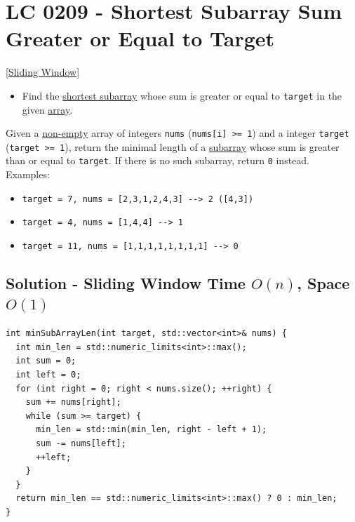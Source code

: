 \section{LC 0209 - Shortest Subarray Sum Greater or Equal to Target}\label{lc0209}
{\hyperref[sec:sliding_window]{[Sliding Window]}}

\begin{tcolorbox}
\begin{itemize}
\item Find the \ul{shortest subarray} whose sum is greater or equal to {\colorbox{CodeBackground}{\lstinline|target|}} in the given \ul{array}.
\end{itemize}
\end{tcolorbox}

Given a \ul{non-empty} array of integers {\colorbox{CodeBackground}{\lstinline|nums|}} ({\colorbox{CodeBackground}{\lstinline|nums[i] >= 1|}}) and a integer {\colorbox{CodeBackground}{\lstinline|target|}} ({\colorbox{CodeBackground}{\lstinline|target >= 1|}}), return the minimal length of a \ul{subarray} whose sum is greater than or equal to {\colorbox{CodeBackground}{\lstinline|target|}}. If there is no such subarray, return {\colorbox{CodeBackground}{\lstinline|0|}} instead.\\

Examples:
\begin{itemize}
\item {\colorbox{CodeBackground}{\lstinline|target = 7, nums = [2,3,1,2,4,3] --> 2 ([4,3])|}}
\item {\colorbox{CodeBackground}{\lstinline|target = 4, nums = [1,4,4] --> 1|}}
\item {\colorbox{CodeBackground}{\lstinline|target = 11, nums = [1,1,1,1,1,1,1,1] --> 0|}}
\end{itemize}

\subsection*{Solution - Sliding Window {\scriptsize\color{gray}\Coffeecup\hspace{1mm}Time $O(n)$, Space $O(1)$}}
\begin{lstlisting}
int minSubArrayLen(int target, std::vector<int>& nums) {
  int min_len = std::numeric_limits<int>::max();
  int sum = 0;
  int left = 0;
  for (int right = 0; right < nums.size(); ++right) {
    sum += nums[right];
    while (sum >= target) {
      min_len = std::min(min_len, right - left + 1);
      sum -= nums[left];
      ++left;
    }
  }
  return min_len == std::numeric_limits<int>::max() ? 0 : min_len;
}
\end{lstlisting}

